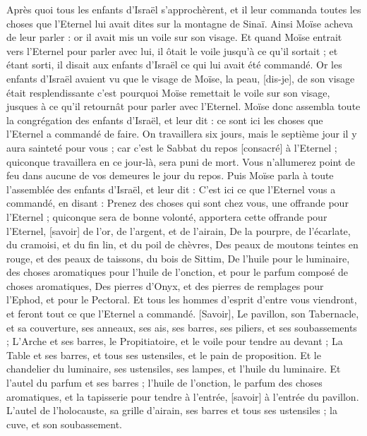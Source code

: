\begin{multicols}{2}
Après quoi tous les enfants d'Israël s'approchèrent, et il leur commanda toutes les choses que l'Eternel lui avait dites sur la montagne de Sinaï.
Ainsi Moïse acheva de leur parler : or il avait mis un voile sur son visage.
Et quand Moïse entrait vers l'Eternel pour parler avec lui, il ôtait le voile jusqu’à ce qu'il sortait ; et étant sorti, il disait aux enfants d'Israël ce qui lui avait été commandé.
Or les enfants d'Israël avaient vu que le visage de Moïse, la peau, [dis-je], de son visage était resplendissante c'est pourquoi Moïse remettait le voile sur son visage, jusques à ce qu'il retournât pour parler avec l'Eternel.
\VerseOne{}Moïse donc assembla toute la congrégation des enfants d'Israël, et leur dit : ce sont ici les choses que l'Eternel a commandé de faire.
On travaillera six jours, mais le septième jour il y aura sainteté pour vous ; car c'est le Sabbat du repos [consacré] à l'Eternel ; quiconque travaillera en ce jour-là, sera puni de mort.
Vous n'allumerez point de feu dans aucune de vos demeures le jour du repos.
Puis Moïse parla à toute l'assemblée des enfants d'Israël, et leur dit : C'est ici ce que l'Eternel vous a commandé, en disant :
Prenez des choses qui sont chez vous, une offrande pour l'Eternel ; quiconque sera de bonne volonté, apportera cette offrande pour l'Eternel, [savoir] de l'or, de l'argent, et de l'airain,
De la pourpre, de l'écarlate, du cramoisi, et du fin lin, et du poil de chèvres,
Des peaux de moutons teintes en rouge, et des peaux de taissons, du bois de Sittim,
De l'huile pour le luminaire, des choses aromatiques pour l'huile de l'onction, et pour le parfum composé de choses aromatiques,
Des pierres d'Onyx, et des pierres de remplages pour l'Ephod, et pour le Pectoral.
Et tous les hommes d'esprit d'entre vous viendront, et feront tout ce que l'Eternel a commandé.
[Savoir], Le pavillon, son Tabernacle, et sa couverture, ses anneaux, ses ais, ses barres, ses piliers, et ses soubassements ;
L'Arche et ses barres, le Propitiatoire, et le voile pour tendre au devant ;
La Table et ses barres, et tous ses ustensiles, et le pain de proposition.
Et le chandelier du luminaire, ses ustensiles, ses lampes, et l'huile du luminaire.
Et l'autel du parfum et ses barres ; l'huile de l'onction, le parfum des choses aromatiques, et la tapisserie pour tendre à l'entrée, [savoir] à l'entrée du pavillon.
L'autel de l'holocauste, sa grille d'airain, ses barres et tous ses ustensiles ; la cuve, et son soubassement.

\end{multicols}

